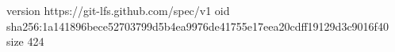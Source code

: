 version https://git-lfs.github.com/spec/v1
oid sha256:1a141896bece52703799d5b4ea9976de41755e17eea20cdff19129d3c9016f40
size 424
